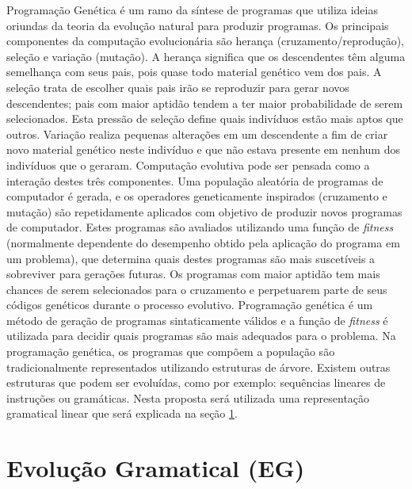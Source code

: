 Programação Genética \cite{burke2009exploring} é um ramo da síntese de programas que utiliza ideias oriundas da teoria da evolução natural para produzir programas. Os principais componentes da computação evolucionária são herança (cruzamento/reprodução), seleção e variação (mutação). A herança significa que os descendentes  têm alguma semelhança com seus pais, pois quase todo material genético vem dos pais. A seleção trata de escolher quais pais irão se reproduzir para gerar novos descendentes; pais com maior aptidão tendem a ter maior probabilidade de serem selecionados. Esta pressão de seleção define quais indivíduos estão mais aptos que outros. Variação realiza pequenas alterações em um descendente a fim de criar novo material genético neste indivíduo e que não estava presente em nenhum dos indivíduos que o geraram. Computação evolutiva pode ser pensada como a interação destes três componentes. 
Uma população aleatória de programas de computador é gerada, e os operadores geneticamente inspirados (cruzamento e mutação) são repetidamente aplicados com objetivo de produzir novos programas de computador. Estes programas são avaliados utilizando uma função de \textit{fitness} (normalmente dependente do desempenho obtido pela aplicação do programa em um problema), que determina quais destes programas são mais suscetíveis a sobreviver para gerações futuras. Os programas com maior aptidão tem mais chances de serem selecionados para o cruzamento e perpetuarem parte de seus códigos genéticos durante o processo evolutivo. 
Programação genética é um método de geração de programas sintaticamente válidos e a função de \textit{fitness} é utilizada para decidir quais programas são mais adequados para o problema.
Na programação genética, os programas que compõem a população são tradicionalmente representados utilizando estruturas de árvore. Existem outras estruturas que podem ser evoluídas, como por exemplo: sequências lineares de instruções ou gramáticas. Nesta proposta será utilizada uma representação gramatical linear que será explicada na seção \ref{subsubsection:EvolucaoGramatical}.

\section{Evolução Gramatical (EG)}
\label{subsubsection:EvolucaoGramatical}

